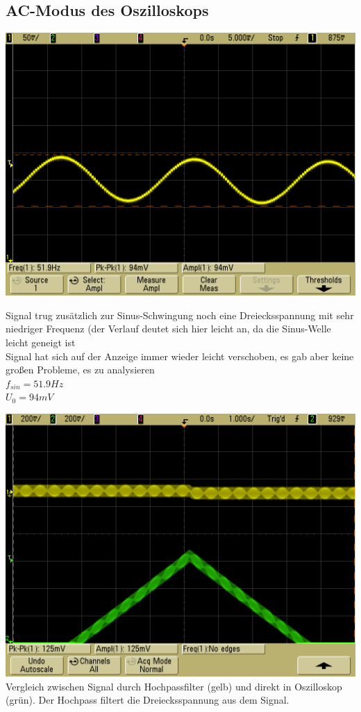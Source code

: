 \documentclass[compress,11pt]{beamer}
\begin{document}
\subsection{AC-Modus des Oszilloskops}
\begin{frame}
\includegraphics[width=\textwidth]{../daten/scope_16}
\end{frame}
\begin{frame}
Signal trug zusätzlich zur Sinus-Schwingung noch eine Dreiecksspannung mit sehr niedriger Frequenz (der Verlauf deutet sich hier leicht an, da die Sinus-Welle leicht geneigt ist \\
Signal hat sich auf der Anzeige immer wieder leicht verschoben, es gab aber keine großen Probleme, es zu analysieren\\
$f_{sin} = 51.9 Hz$\\
$U_0 = 94 mV$
\end{frame}
\includegraphics[width=\textwidth]{../daten/scope_21}
Vergleich zwischen Signal durch Hochpassfilter (gelb) und direkt in Oszilloskop (grün). Der Hochpass filtert die Dreiecksspannung aus dem Signal.
\end{document}

